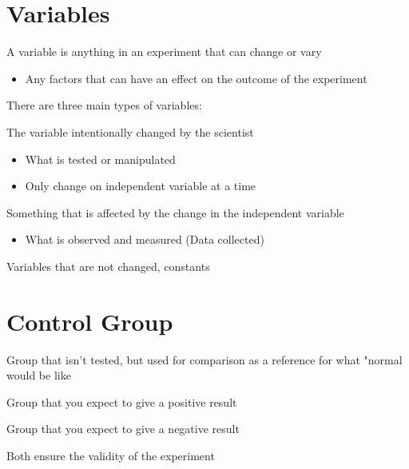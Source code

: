\section{Variables}
\begin{definition}[Variable]\label{def:variable}
    A variable is anything in an experiment that can change or vary
    \begin{itemize}
        \item Any factors that can have an effect on the outcome of the experiment
    \end{itemize}
    There are three main types of variables:
    \begin{definition}\label{def:independent_variable}
        The variable intentionally changed by the scientist
        \begin{itemize}
            \item What is tested or manipulated
            \item Only change on independent variable at a time
        \end{itemize}
    \end{definition}
    \begin{definition}\label{def:dependent_variable}
        Something that is affected by the change in the independent variable
        \begin{itemize}
            \item What is observed and measured (Data collected)
        \end{itemize}
    \end{definition}
    \begin{definition}\label{def:controlled_variable}
        Variables that are not changed, constants
    \end{definition}
\end{definition}
\section{Control Group}
\begin{definition}\label{def:control_group}
    Group that isn't tested, but used for comparison as a reference for what "normal would be like
    \begin{definition}\label{def:positive_control}
        Group that you expect to give a positive result
    \end{definition}
    \begin{definition}\label{def:negative_control}
        Group that you expect to give a negative result
    \end{definition}
    Both ensure the validity of the experiment
\end{definition}
